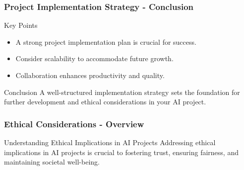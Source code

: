 \documentclass[aspectratio=169]{beamer}
\begin{document}
\begin{frame}[fragile]
    \frametitle{Project Implementation Strategy - Conclusion}
    \begin{block}{Key Points}
        \begin{itemize}
            \item A strong project implementation plan is crucial for success.
            \item Consider scalability to accommodate future growth.
            \item Collaboration enhances productivity and quality.
        \end{itemize}
    \end{block}
    \begin{block}{Conclusion}
        A well-structured implementation strategy sets the foundation for further development and ethical considerations in your AI project.
    \end{block}
\end{frame}

\begin{frame}[fragile]
    \frametitle{Ethical Considerations - Overview}
    \begin{block}{Understanding Ethical Implications in AI Projects}
        Addressing ethical implications in AI projects is crucial to fostering trust, ensuring fairness, and maintaining societal well-being.
    \end{block}
\end{frame}
\end{document}

